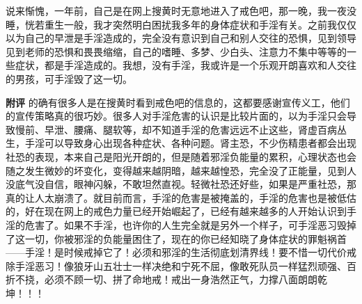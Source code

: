 \begin{case}
    说来惭愧，一年前，自己是在网上搜黄时无意地进入了戒色吧，那一晚，我一夜没睡，恍若重生一般，我才突然明白困扰我多年的身体症状和手淫有关。之前我仅仅以为自己的早泄是手淫造成的，完全没有意识到自己和别人交往的恐惧，见到领导见到老师的恐惧和畏畏缩缩，自己的嗜睡、多梦、少白头、注意力不集中等等的一些症状，都是手淫造成的。我想，没有手淫，我或许是一个乐观开朗喜欢和人交往的男孩，可手淫毁了这一切。

    \textbf{附评} 的确有很多人是在搜黄时看到戒色吧的信息的，这都要感谢宣传义工，他们的宣传策略真的很巧妙。很多人对手淫危害的认识是比较片面的，以为手淫只会导致慢前、早泄、腰痛、腿软等，却不知道手淫的危害远远不止这些，肾虚百病丛生，手淫可以导致身心出现各种症状、各种问题。肾主恐，不少伤精患者都会出现社恐的表现，本来自己是阳光开朗的，但是随着邪淫负能量的累积，心理状态也会随之发生微妙的坏变化，变得越来越阴暗，越来越惶恐，完全没了正能量，见到人没底气没自信，眼神闪躲，不敢坦然直视。轻微社恐还好些，如果是严重社恐，那真的让人太崩溃了。就目前而言，手淫的危害是被掩盖的，手淫的危害也是被低估的，好在现在网上的戒色力量已经开始崛起了，已经有越来越多的人开始认识到手淫的危害了。如果不手淫，也许你的人生完全就是另外一个样子，可手淫恶习毁掉了这一切，你被邪淫的负能量困住了，现在的你已经知晓了身体症状的罪魁祸首——手淫！是时候戒掉它了！必须和邪淫的生活彻底划清界线！要不惜一切代价戒除手淫恶习！像狼牙山五壮士一样决绝和宁死不屈，像敢死队员一样猛烈顽强、百折不挠，必须不顾一切、拼了命地戒！戒出一身浩然正气，力撑八面朗朗乾坤！！！
\end{case}

